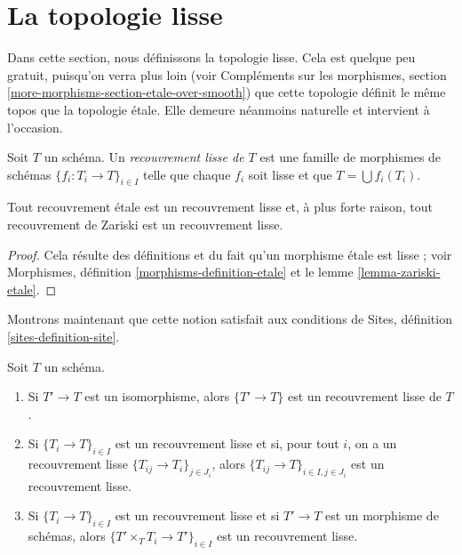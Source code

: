 \section{La topologie lisse}
\label{section-smooth}

\noindent
Dans cette section, nous définissons la topologie lisse.
Cela est quelque peu gratuit, puisqu'on verra plus loin (voir
Compléments sur les morphismes, section \ref{more-morphisms-section-etale-over-smooth})
que cette topologie définit le même topos que la
topologie étale. Elle demeure néanmoins naturelle et intervient
à l'occasion.

\begin{definition}
\label{definition-smooth-covering}
Soit $T$ un schéma. Un {\it recouvrement lisse de $T$} est une famille
de morphismes de schémas $\{f_i : T_i \to T\}_{i \in I}$
telle que chaque $f_i$ soit lisse et
que $T = \bigcup f_i(T_i)$.
\end{definition}

\begin{lemma}
\label{lemma-zariski-etale-smooth}
Tout recouvrement étale est un recouvrement lisse et, à plus forte raison,
tout recouvrement de Zariski est un recouvrement lisse.
\end{lemma}

\begin{proof}
Cela résulte des définitions et du fait qu'un morphisme étale est
lisse ; voir
Morphismes, définition \ref{morphisms-definition-etale}
et le lemme \ref{lemma-zariski-etale}.
\end{proof}

\noindent
Montrons maintenant que cette notion satisfait aux conditions de
Sites, définition \ref{sites-definition-site}.

\begin{lemma}
\label{lemma-smooth}
Soit $T$ un schéma.
\begin{enumerate}
\item Si $T' \to T$ est un isomorphisme, alors $\{T' \to T\}$
est un recouvrement lisse de $T$.
\item Si $\{T_i \to T\}_{i\in I}$ est un recouvrement lisse et si, pour tout
$i$, on a un recouvrement lisse $\{T_{ij} \to T_i\}_{j\in J_i}$, alors
$\{T_{ij} \to T\}_{i \in I, j\in J_i}$ est un recouvrement lisse.
\item Si $\{T_i \to T\}_{i\in I}$ est un recouvrement lisse
et si $T' \to T$ est un morphisme de schémas, alors
$\{T' \times_T T_i \to T'\}_{i\in I}$ est un recouvrement lisse.
\end{enumerate}
\end{lemma}

